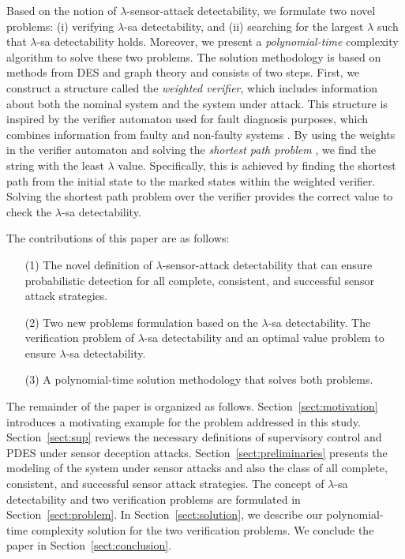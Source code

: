 Based on the notion of $\lambda$-sensor-attack detectability, we formulate two novel problems: (i) verifying $\lambda$-sa detectability, and (ii) searching for the largest $\lambda$ such that $\lambda$-sa detectability holds. 
Moreover, we present a \emph{polynomial-time} complexity algorithm to solve these two problems. 
The solution methodology is based on methods from DES and graph theory and consists of two steps. 
First, we construct a structure called the \emph{weighted verifier}, which includes information about both the nominal system and the system under attack. 
This structure is inspired by the verifier automaton used for fault diagnosis purposes, which combines information from faulty and non-faulty systems \citep{yoo2002polynomial}.
By using the weights in the verifier automaton and solving the \emph{shortest path problem} \citep{cormen2022introduction}, we find the string with the least $\lambda$ value.
Specifically, this is achieved by finding the shortest path from the initial state to the marked states within the weighted verifier. 
Solving the shortest path problem over the verifier provides the correct value to check the $\lambda$-sa detectability.

The contributions of this paper are as follows: 
\begin{enumerate}
\item[(1)] The novel definition of $\lambda$-sensor-attack detectability that can ensure probabilistic detection for all complete, consistent, and successful sensor attack strategies. 
\item[(2)] Two new problems formulation based on the $\lambda$-sa detectability. The verification problem of $\lambda$-sa detectability and an optimal value problem to ensure $\lambda$-sa detectability.
\item[(3)] A polynomial-time solution methodology that solves both problems.
\end{enumerate}
The remainder of the paper is organized as follows. Section~\ref{sect:motivation} introduces a motivating example for the problem addressed in this study. 
Section~\ref{sect:sup} reviews the necessary definitions of supervisory control and PDES under sensor deception attacks. 
Section~\ref{sect:preliminaries} presents the modeling of the system under sensor attacks and also the class of all complete, consistent, and successful sensor attack strategies. 
The concept of $\lambda$-sa detectability and two verification problems are formulated in Section~\ref{sect:problem}. 
In Section~\ref{sect:solution}, we describe our polynomial-time complexity solution for the two verification problems. We conclude the paper in Section~\ref{sect:conclusion}. 